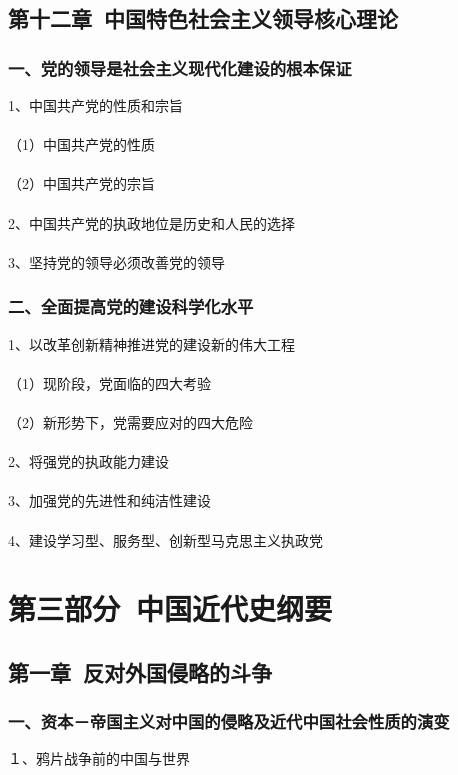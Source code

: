 \documentclass{ctexart}
\begin{document}
\subsection{第十二章\ 中国特色社会主义领导核心理论}
\subsubsection{一、党的领导是社会主义现代化建设的根本保证}
1、中国共产党的性质和宗旨
\\\\
（1）中国共产党的性质
\\\\
（2）中国共产党的宗旨
\\\\

2、中国共产党的执政地位是历史和人民的选择
\\\\

3、坚持党的领导必须改善党的领导
\subsubsection{二、全面提高党的建设科学化水平}
1、以改革创新精神推进党的建设新的伟大工程
\\\\
（1）现阶段，党面临的四大考验
\\\\
（2）新形势下，党需要应对的四大危险
\\\\

2、将强党的执政能力建设
\\\\

3、加强党的先进性和纯洁性建设
\\\\

4、建设学习型、服务型、创新型马克思主义执政党

\section{第三部分\ 中国近代史纲要}

\subsection{第一章\ 反对外国侵略的斗争}

\subsubsection{一、资本－帝国主义对中国的侵略及近代中国社会性质的演变}
１、鸦片战争前的中国与世界
\\\\
\end{document}
